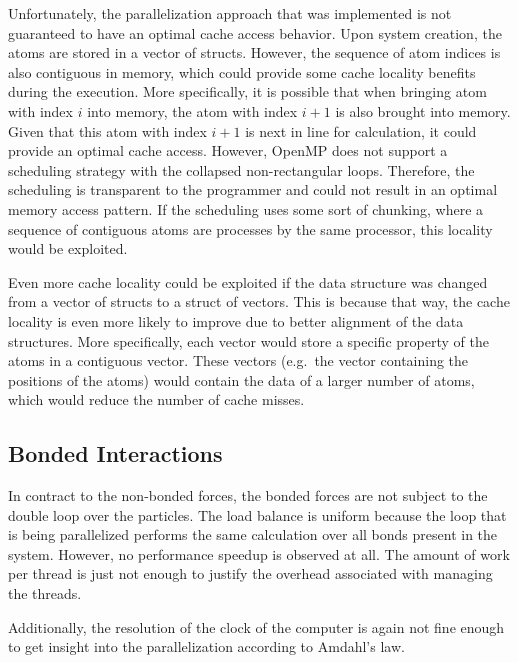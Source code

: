 \documentclass[conference]{IEEEtran}
\begin{document}
Unfortunately, the parallelization approach that was implemented is not guaranteed to have an optimal cache access behavior.
Upon system creation, the atoms are stored in a vector of structs. However, the sequence of atom indices is also 
contiguous in memory, which could provide some
cache locality benefits during the execution. More specifically, it is possible that when bringing atom with index
$i$ into memory, the atom with index $i+1$ is also brought into memory. Given that this atom with index $i+1$ is next
in line for calculation, it could provide an optimal cache access. However, OpenMP does not support a scheduling
strategy with the collapsed non-rectangular loops. Therefore, the scheduling is transparent to the programmer
and could not result in an optimal memory access pattern. If the scheduling uses some sort of chunking, where
a sequence of contiguous atoms are processes by the same processor, this locality would be exploited.

Even more cache locality could be exploited if the data structure was changed from a vector of structs to a struct 
of vectors. This is because that way, the cache locality is even more likely to improve due to better alignment of
the data structures. More specifically, each vector would store a specific property of the atoms in a contiguous vector.
These vectors (e.g.\ the vector containing the positions of the atoms) would contain the data of a larger number of
atoms, which would reduce the number of cache misses.

\subsection{Bonded Interactions}
In contract to the non-bonded forces, the bonded forces are not subject to the double loop over the particles.
The load balance is 
uniform because the loop that is being parallelized performs the same calculation over all bonds present in the
system.
However,
no performance speedup is observed at all. The amount of work per thread is just not enough to justify the overhead
associated with managing the threads.

Additionally, the resolution of the clock of the computer is again not fine enough to get insight into the parallelization
according to Amdahl's law.




\end{document}
